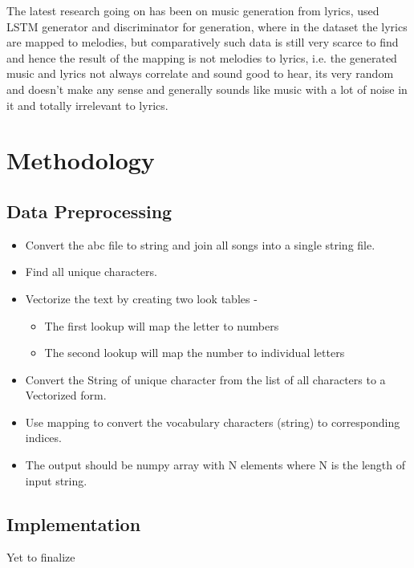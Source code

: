 \documentclass[oneside,12pt]{Classes/RoboticsLaTeX}
\begin{document}
The latest research going on has been on music generation from lyrics, \cite{lstmgan} used LSTM generator and discriminator for generation, where in the dataset the lyrics are mapped to melodies, but comparatively such data is still very scarce to find and hence the result of the mapping is not melodies to lyrics, i.e. the generated music and lyrics not always correlate and sound good to hear, its very random and doesn't make any sense and generally sounds like music with a lot of noise in it and totally irrelevant to lyrics.

\chapter{Methodology}
\label{chap:methodology}

\section{Data Preprocessing}

\begin{itemize}
  \item Convert the abc file to string and join all songs into a single string file.
  \item Find all unique characters.
  \item Vectorize the text by creating two look tables - 
  \begin{itemize}
    \item The first lookup will map the letter to numbers 
    \item The second lookup will map the number to individual letters
  \end{itemize}
  \item Convert the String of unique character from the list of all characters to a Vectorized form.
  \item Use mapping to convert the vocabulary characters (string) to corresponding indices.
  \item The output should be numpy array with N elements where N is the length of input string.
\end{itemize}

\section{Implementation}

Yet to finalize
\renewcommand{\bibname}{References}           %



\end{document}

